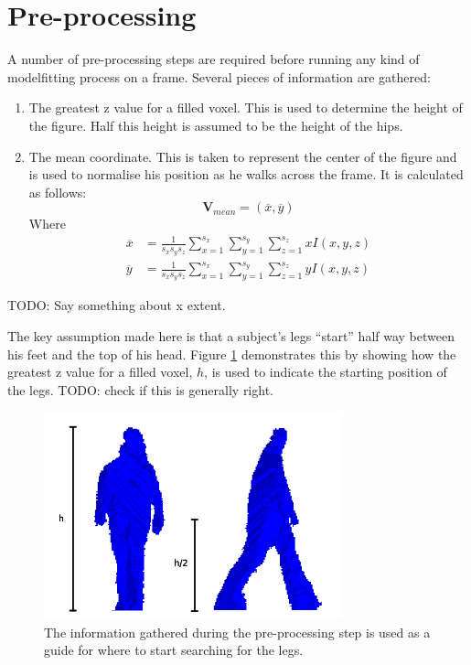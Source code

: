 \section{Pre-processing}\label{LocatingCenter}

A number of pre-processing steps are required before running any kind of modelfitting process on a frame.
Several pieces of information are gathered:

\begin{enumerate}
	\item The greatest z value for a filled voxel.
		This is used to determine the height of the figure.
		Half this height is assumed to be the height of the hips.
	\item The mean coordinate.
		This is taken to represent the center of the figure and is used to normalise his position as he walks across the frame.
		It is calculated as follows:
		\begin{equation}
			\mathbf{V}_{mean} = (\overline{x}, \overline{y})
		\end{equation}
		Where
		\begin{align}
			\overline{x} &= \frac{1}{s_x s_y s_z} \sum_{x=1}^{s_x} \sum_{y=1}^{s_y} \sum_{z=1}^{s_z} x I(x,y,z) \\
			\overline{y} &= \frac{1}{s_x s_y s_z} \sum_{x=1}^{s_x} \sum_{y=1}^{s_y} \sum_{z=1}^{s_z} y I(x,y,z)
		\end{align}
\end{enumerate}

TODO: Say something about x extent.

The key assumption made here is that a subject's legs ``start'' half way between his feet and the top of his head.
Figure \ref{Preprocessing} demonstrates this by showing how the greatest z value for a filled voxel, $h$, is used to
indicate the starting position of the legs.
TODO: check if this is generally right.

\begin{figure}[b]
	\centering
	\includegraphics[height=6cm]{preprocessing.png}
	\caption{The information gathered during the pre-processing step is used as a guide for where to start searching for the legs.}
	\label{Preprocessing}
\end{figure}
